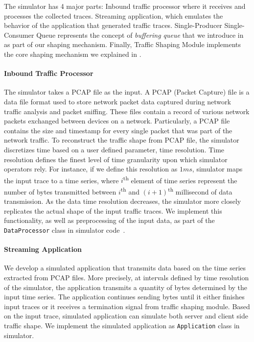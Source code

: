 The simulator has 4 major parts: 
Inbound traffic processor where it receives and processes the collected traces.
Streaming application, which emulates the behavior of the application that generated traffic traces.
Single-Producer Single-Consumer Queue represents the concept of \textit{buffering queue} that we introduce in  as part of our shaping mechanism.
Finally, Traffic Shaping Module implements the core shaping mechanism we explained in .


\paragraph{Inbound Traffic Processor}\label{subsubsec:design-sim-inbound}
The simulator takes a PCAP file as the input. 
A PCAP (Packet Capture) file is a data file format used to store network packet data captured during network traffic analysis and packet sniffing.
These files contain a record of various network packets exchanged between devices on a network.
Particularly, a PCAP file contains the size and timestamp for every single packet that was part of the network traffic.
To reconstruct the traffic shape from PCAP file, the simulator discretizes time based on a user defined parameter, time resolution.
Time resolution defines the finest level of time granularity upon which simulator operators rely.
For instance, if we define this resolution as $1ms$, simulator maps the input trace to a time series, where $i$\textsuperscript{th} element of time series represent the number of bytes transmitted between $i$\textsuperscript{th} and $(i+1)$\textsuperscript{th} millisecond of data transmission.
As the data time resolution decreases, the simulator more closely replicates the actual shape of the input traffic traces.
We implement this functionality, as well as preprocessing of the input data, as part of the \texttt{DataProcessor} class in simulator code~\cite{netshaper_repo}.



\paragraph{Streaming Application}\label{subsubsec:design-simulator-app}
We develop a simulated application that transmits data based on the time series extracted from PCAP files. 
More precisely, at intervals defined by time resolution of the simulator, the application transmits a quantity of bytes determined by the input time series.
The application continues sending bytes until it either finishes input traces or it receives a termination signal from traffic shaping module.
Based on the input trace, simulated application can simulate both server and client side traffic shape.
We implement the simulated application as \texttt{Application} class in simulator.

